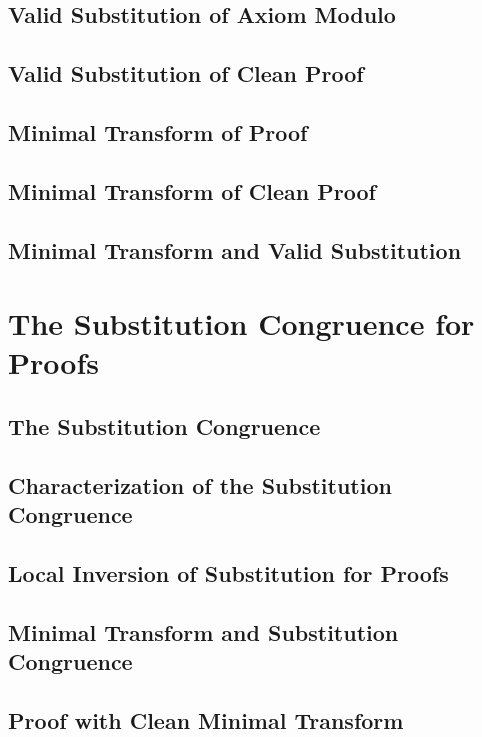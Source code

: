 \documentclass{report}
\begin{document}
    \subsection{Valid Substitution of Axiom Modulo}
      
    \subsection{Valid Substitution of Clean Proof}
      
    \subsection{Minimal Transform of Proof}
      
    \subsection{Minimal Transform of Clean Proof}
      
    \subsection{Minimal Transform and Valid Substitution}
      
\section{The Substitution Congruence for Proofs}
    \subsection{The Substitution Congruence}
      
    \subsection{Characterization of the Substitution Congruence}
      
    \subsection{Local Inversion of Substitution for Proofs}
      
    \subsection{Minimal Transform and Substitution Congruence}
      
    \subsection{Proof with Clean Minimal Transform}
      
\end{document}
